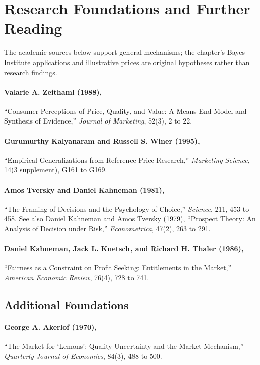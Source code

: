 \section*{Research Foundations and Further Reading}

The academic sources below support general mechanisms; the chapter's Bayes Institute applications and illustrative prices are original hypotheses rather than research findings.

\paragraph*{Valarie A. Zeithaml (1988),} ``Consumer Perceptions of Price, Quality, and Value: A Means-End Model and Synthesis of Evidence,'' \emph{Journal of Marketing}, 52(3), 2 to 22.

\paragraph*{Gurumurthy Kalyanaram and Russell S. Winer (1995),} ``Empirical Generalizations from Reference Price Research,'' \emph{Marketing Science}, 14(3 supplement), G161 to G169.

\paragraph*{Amos Tversky and Daniel Kahneman (1981),} ``The Framing of Decisions and the Psychology of Choice,'' \emph{Science}, 211, 453 to 458. See also Daniel Kahneman and Amos Tversky (1979), ``Prospect Theory: An Analysis of Decision under Risk,'' \emph{Econometrica}, 47(2), 263 to 291.

\paragraph*{Daniel Kahneman, Jack L. Knetsch, and Richard H. Thaler (1986),} ``Fairness as a Constraint on Profit Seeking: Entitlements in the Market,'' \emph{American Economic Review}, 76(4), 728 to 741.

\subsection*{Additional Foundations}

\paragraph*{George A. Akerlof (1970),} ``The Market for `Lemons': Quality Uncertainty and the Market Mechanism,'' \emph{Quarterly Journal of Economics}, 84(3), 488 to 500.

